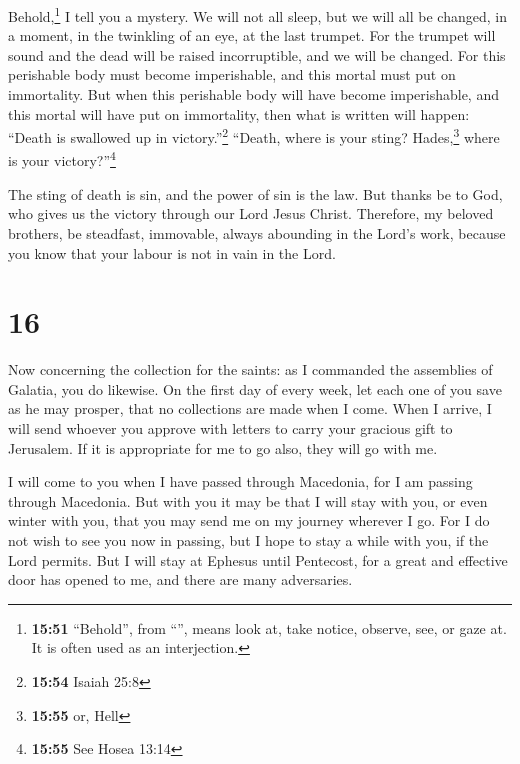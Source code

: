  Behold,\footnote{\textbf{15:51} ``Behold'', from
  ``'', means look at, take notice, observe, see, or gaze
  at. It is often used as an interjection.} I tell you a mystery. We
will not all sleep, but we will all be changed,  in a
moment, in the twinkling of an eye, at the last trumpet. For the trumpet
will sound and the dead will be raised incorruptible, and we will be
changed.  For this perishable body must become
imperishable, and this mortal must put on immortality. 
But when this perishable body will have become imperishable, and this
mortal will have put on immortality, then what is written will happen:
``Death is swallowed up in victory.''\footnote{\textbf{15:54} Isaiah
  25:8}  ``Death, where is your sting? Hades,\footnote{\textbf{15:55}
  or, Hell} where is your victory?''\footnote{\textbf{15:55} See Hosea
  13:14}

 The sting of death is sin, and the power of sin is the
law.  But thanks be to God, who gives us the victory
through our Lord Jesus Christ.  Therefore, my beloved
brothers, be steadfast, immovable, always abounding in the Lord's work,
because you know that your labour is not in vain in the Lord.

\hypertarget{section-15}{%
\section{16}\label{section-15}}

 Now concerning the collection for the saints: as I
commanded the assemblies of Galatia, you do likewise.  On
the first day of every week, let each one of you save as he may prosper,
that no collections are made when I come.  When I arrive,
I will send whoever you approve with letters to carry your gracious gift
to Jerusalem.  If it is appropriate for me to go also,
they will go with me.

 I will come to you when I have passed through Macedonia,
for I am passing through Macedonia.  But with you it may
be that I will stay with you, or even winter with you, that you may send
me on my journey wherever I go.  For I do not wish to see
you now in passing, but I hope to stay a while with you, if the Lord
permits.  But I will stay at Ephesus until Pentecost,
 for a great and effective door has opened to me, and
there are many adversaries.

